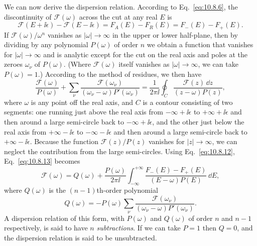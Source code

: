 We can now derive the dispersion relation. According to
Eq.~\eqref{eq:10.8.6}, the discontinuity of $\mathcal F(\omega)$ across the
cut at any real $E$ is
\begin{equation}
  \mathcal F(E+\ii\epsilon)-\mathcal F(E-\ii\epsilon)
  =F_A(E)-F_R(E)=F_-(E)-F_+(E).
  \tag{10.8.12}\label{eq:10.8.12}
\end{equation}
If $\mathcal F(\omega)/\omega^n$ vanishes as $|\omega|\to\infty$ in the
upper or lower half-plane, then by dividing by any polynomial $P(\omega)$
of order $n$ we obtain a function that vanishes for $|\omega|\to\infty$
and is analytic except for the cut on the real axis and poles at the zeroes
$\omega_\nu$ of $P(\omega)$. (Where $\mathcal F(\omega)$ itself vanishes
as $|\omega|\to\infty$, we can take $P(\omega)=1$.) According to the
method of residues, we then have
\begin{equation}
  \frac{\mathcal F(\omega)}{P(\omega)}
  +\sum_\nu\frac{\mathcal F(\omega_\nu)}
  {(\omega_\nu-\omega)P'(\omega_\nu)}
  =\frac{1}{2\pi \ii}\oint_C
  \frac{\mathcal F(z)\,\dd z}{(z-\omega)P(z)},
  \tag{10.8.13}\label{eq:10.8.13}
\end{equation}
where $\omega$ is any point off the real axis, and $C$ is a contour consisting
of two segments: one running just above the real axis from $-\infty+\ii\epsilon$
to $+\infty+\ii\epsilon$ and then around a large semi-circle back to
$-\infty+\ii\epsilon$, and the other just below the real axis from
$+\infty-\ii\epsilon$ to $-\infty-\ii\epsilon$ and then around a large
semi-circle back to $+\infty-\ii\epsilon$. Because the function
$\mathcal F(z)/P(z)$ vanishes for $|z|\to\infty$, we can neglect the
contribution from the large semi-circles. Using Eq.~\eqref{eq:10.8.12},
Eq.~\eqref{eq:10.8.13} becomes
\begin{equation}
  \mathcal F(\omega)=Q(\omega)+\frac{P(\omega)}{2\pi \ii}
  \int_{-\infty}^{+\infty}
  \frac{F_-(E)-F_+(E)}{(E-\omega)P(E)}\,\dd E,
  \tag{10.8.14}\label{eq:10.8.14}
\end{equation}
where $Q(\omega)$ is the $(n-1)$th-order polynomial
\begin{equation*}
  Q(\omega)=-P(\omega)\sum_\nu
  \frac{\mathcal F(\omega_\nu)}
  {(\omega_\nu-\omega)P'(\omega_\nu)}.
\end{equation*}
A dispersion relation of this form, with $P(\omega)$ and $Q(\omega)$ of
order $n$ and $n-1$ respectively, is said to have $n$ \emph{subtractions}.
If we can take $P=1$ then $Q=0$, and the dispersion relation is said to be
unsubtracted.

